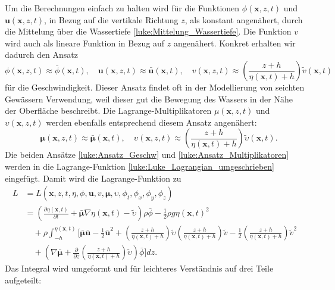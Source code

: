 Um die Berechnungen einfach zu halten wird für die Funktionen $\phi (\bm{x},z,t)$ und $\bm{u} (\bm{x},z,t)$, in Bezug auf die vertikale Richtung $z$, als konstant angenähert, durch die Mittelung über die Wassertiefe \eqref{luke:Mittelung_Wassertiefe}.
Die Funktion $v$ wird auch als lineare Funktion in Bezug auf $z$ angenähert. 
Konkret erhalten wir dadurch den Ansatz
\begin{equation}
	\phi(\bm{x},z,t) \approx \bar{\phi}(\bm{x}, t), \quad \bm{u}(\bm{x},z,t) \approx \bar{\bm{u}}(\bm{x}, t), \quad v(\bm{x},z,t) \approx \left(\frac{z + h}{\eta(\bm{x}, t) + h}\right) \tilde{v}(\bm{x}, t)
	\label{luke:Ansatz_Geschw}
\end{equation}
für die Geschwindigkeit.
Dieser Ansatz findet oft in der Modellierung von seichten Gewässern Verwendung, weil dieser gut die Bewegung des Wassers in der Nähe der Oberfläche beschreibt.
Die Lagrange-Multiplikatoren $\mu(\bm{x},z,t)$ und $\upsilon(\bm{x},z,t)$ werden ebenfalls entsprechend diesem Ansatz angenähert:
\begin{equation}
	\quad \bm{\mu}(\bm{x},z,t) \approx \bar{\bm{\mu}}(\bm{x}, t), \quad \upsilon(\bm{x},z,t) \approx \left(\frac{z + h}{\eta(\bm{x}, t) + h}\right)\tilde{\upsilon}(\bm{x}, t).
	\label{luke:Ansatz_Multiplikatoren}
\end{equation}
Die beiden Ansätze \eqref{luke:Ansatz_Geschw} und \eqref{luke:Ansatz_Multiplikatoren} werden in die Lagrange-Funktion \eqref{luke:Luke_Lagrangian_umgeschrieben} eingefügt.
Damit wird die Lagrange-Funktion zu
\begin{align*}
	L&=
	L(\bm{x},z,t,\eta,\phi,\bm{u}, v, \bm{\mu},\upsilon,\phi_t,\phi_x,\phi_y,\phi_z)
	\\
	&=
	\left(\frac{\partial \eta(\bm{x}, t)}{\partial t}
	+
	\bar{\bm{\mu}}  \nabla \eta(\bm{x}, t)
	-
	\widetilde{\upsilon}\right)\rho \bar{\phi}
	-
	\frac{1}{2} \rho g \eta(\bm{x}, t)^2
	\\
	&\quad+
	\rho\int_{-h}^{\eta(\bm{x}, t)} \Bigg[ \bar{\bm{\mu}}  \bar{\bm{u}} - \frac{1}{2} \bar{\bm{u}}^2 +\left(\frac{z + h}{\eta(\bm{x}, t) + h}\right)\tilde{\upsilon} \left(\frac{z + h}{\eta(\bm{x}, t) + h}\right)\tilde{v} - \frac{1}{2} \left(\frac{z + h}{\eta(\bm{x}, t) + h}\right)\tilde{v}^2 
	\\
	&\quad+\left(\nabla \bar{\bm{\mu}} + \frac{\partial}{\partial z} \left(\frac{z + h}{\eta(\bm{x}, t) + h}\right)\tilde{\upsilon}\right) \bar{\phi} \Bigg] dz.
\end{align*}
Das Integral wird umgeformt und für leichteres Verständnis auf drei Teile aufgeteilt:
